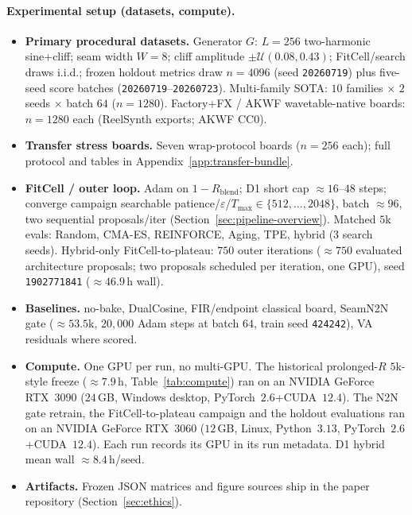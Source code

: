 \paragraph{Experimental setup (datasets, compute).}
\begin{itemize}
  \item \textbf{Primary procedural datasets.} Generator $G$: $L{=}256$ two-harmonic sine{+}cliff; seam width $W{=}8$; cliff amplitude $\pm\mathcal{U}(0.08,0.43)$; FitCell/search draws i.i.d.; frozen holdout metrics draw $n{=}4096$ (seed \texttt{20260719}) plus five-seed score batches (\texttt{20260719}--\texttt{20260723}).
    Multi-family SOTA: $10$ families $\times$ $2$ seeds $\times$ batch $64$ ($n{=}1280$).
    Factory+FX / AKWF wavetable-native boards: $n{=}1280$ each (ReelSynth exports; AKWF CC0).
  \item \textbf{Transfer stress boards.} Seven wrap-protocol boards ($n{=}256$ each); full protocol and tables in Appendix~\ref{app:transfer-bundle}.
  \item \textbf{FitCell / outer loop.} Adam on $1-R_{\mathrm{blend}}$; D1 short cap ${\approx}16$--$48$ steps; converge campaign searchable patience/$\varepsilon$/$T_{\max}\!\in\!\{512,\ldots,2048\}$, batch ${\approx}96$, two sequential proposals/iter (Section~\ref{sec:pipeline-overview}).
    Matched $5$k evals: Random, CMA-ES, REINFORCE, Aging, TPE, hybrid (3 search seeds).
    Hybrid-only FitCell-to-plateau: $750$ outer iterations (${\approx}750$ evaluated architecture proposals; two proposals scheduled per iteration, one GPU), seed \texttt{1902771841} (${\approx}46.9$\,h wall).
  \item \textbf{Baselines.} no-bake, DualCosine, FIR/endpoint classical board, SeamN2N gate (${\approx}53.5$k, $20{,}000$ Adam steps at batch $64$, train seed \texttt{424242}), VA residuals where scored.
  \item \textbf{Compute.} One GPU per run, no multi-GPU. The historical prolonged-$R$ $5$k-style freeze (${\approx}7.9$\,h, Table~\ref{tab:compute}) ran on an NVIDIA GeForce RTX~3090 ($24$\,GB, Windows desktop, PyTorch~$2.6$+CUDA~$12.4$). The N2N gate retrain, the FitCell-to-plateau campaign and the holdout evaluations ran on an NVIDIA GeForce RTX~3060 ($12$\,GB, Linux, Python~$3.13$, PyTorch~$2.6$+CUDA~$12.4$). Each run records its GPU in its run metadata. D1 hybrid mean wall ${\approx}8.4$\,h/seed.
  \item \textbf{Artifacts.} Frozen JSON matrices and figure sources ship in the paper repository (Section~\ref{sec:ethics}).
\end{itemize}

